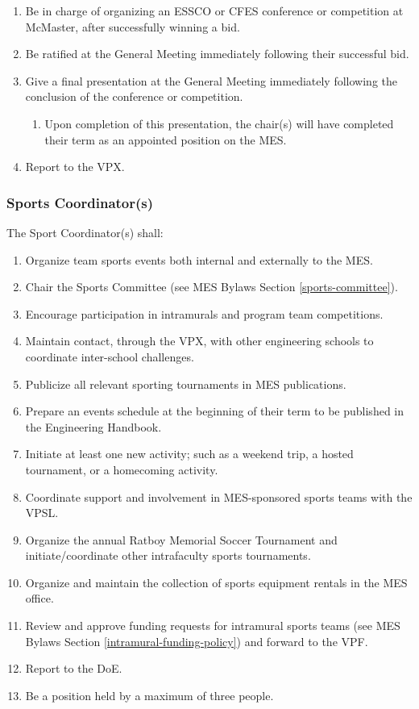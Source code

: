 \begin{enumerate}
 \item
  Be in charge of organizing an ESSCO or CFES conference or competition at McMaster, after successfully winning a bid.
 \item
  Be ratified at the General Meeting immediately following their successful bid.
 \item
  Give a final presentation at the General Meeting immediately following the conclusion of the conference or competition.

  \begin{enumerate}
   \item
    Upon completion of this presentation, the chair(s) will have completed their term as an appointed position on the MES.
  \end{enumerate}
 \item
  Report to the VPX.

\end{enumerate}

\subsubsection{Sports Coordinator(s)}
\label{sports-coordinators}
The Sport Coordinator(s) shall:

\begin{enumerate}
 \item
  Organize team sports events both internal and externally to the MES.
 \item
  Chair the Sports Committee (see MES Bylaws Section \ref{sports-committee}).
 \item
  Encourage participation in intramurals and program team competitions.
 \item
  Maintain contact, through the VPX, with other engineering schools to coordinate inter-school challenges.
 \item
  Publicize all relevant sporting tournaments in MES publications.
 \item
  Prepare an events schedule at the beginning of their term to be published in the Engineering Handbook.
 \item
  Initiate at least one new activity; such as a weekend trip, a hosted tournament, or a homecoming activity.
 \item
  Coordinate support and involvement in MES-sponsored sports teams with the VPSL.
 \item
  Organize the annual Ratboy Memorial Soccer Tournament and initiate/coordinate other intrafaculty sports tournaments.
 \item
  Organize and maintain the collection of sports equipment rentals in the MES office.
 \item
  Review and approve funding requests for intramural sports teams (see MES Bylaws Section \ref{intramural-funding-policy}) and forward to the VPF.
 \item
  Report to the DoE.
 \item
  Be a position held by a maximum of three people.
\end{enumerate}

